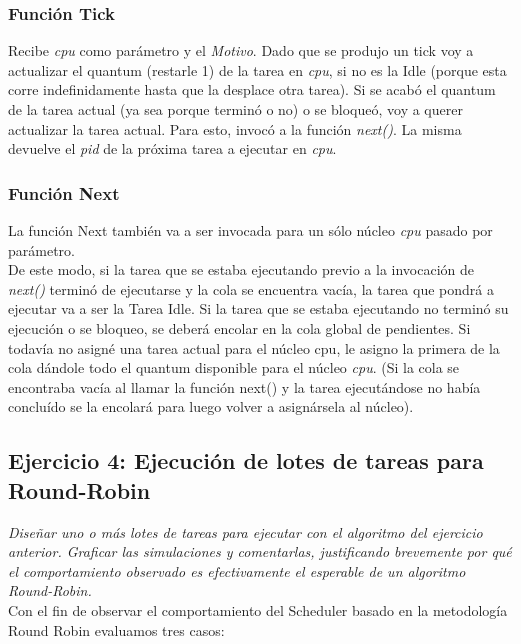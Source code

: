 \documentclass[a4paper]{article}
\begin{document}
\subsubsection*{Funci\'on Tick}	

Recibe \emph{cpu} como par\'ametro y el \emph{Motivo}. Dado que se produjo un tick voy a actualizar el quantum (restarle 1) de la tarea en \emph{cpu}, si no es la Idle (porque esta corre indefinidamente hasta que la desplace otra tarea). 
Si se acab\'o el quantum de la tarea actual (ya sea porque termin\'o o no) o se bloque\'o, voy a querer actualizar la tarea actual. Para esto, invocó a la funci\'on \emph{next()}. La misma devuelve el \emph{pid} de la próxima tarea a ejecutar en \emph{cpu}.

\subsubsection*{Funci\'on Next}	
	
La funci\'on Next tambi\'en va a ser invocada para un s\'olo n\'ucleo \emph{cpu} pasado por par\'ametro.\\
De este modo, si la tarea que se estaba ejecutando previo a la invocaci\'on de \emph{next()} termin\'o de ejecutarse y la cola se encuentra vac\'ia, la tarea que pondr\'a a ejecutar va a ser la Tarea Idle.
Si la tarea que se estaba ejecutando no termin\'o su ejecuci\'on o se bloqueo, se deber\'a encolar en la cola global de pendientes.
Si todav\'ia no asign\'e una tarea actual para el n\'ucleo cpu, le asigno la primera de la cola d\'andole todo el quantum disponible para el n\'ucleo \emph{cpu}. (Si la cola se encontraba vac\'ia al llamar la funci\'on next() y la tarea ejecut\'andose no hab\'ia conclu\'ido se la encolar\'a para luego volver a asign\'arsela al n\'ucleo).\\
 
\bigskip 
 
 
 \subsection{Ejercicio 4: Ejecuci\'on de lotes de tareas para Round-Robin}
 
\textit{Dise\~nar uno o m\'as lotes de tareas para ejecutar con el algoritmo del ejercicio anterior. Graficar las simulaciones y comentarlas, justificando brevemente por qu\'e el comportamiento observado es efectivamente el esperable de un algoritmo Round-Robin.}\\


Con el fin de observar el comportamiento del Scheduler basado en la metodolog\'ia Round Robin evaluamos tres casos:
\end{document}
